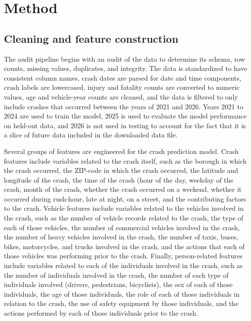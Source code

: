 \documentclass{article}
\begin{document}
\section{Method}
\subsection{Cleaning and feature construction}
The audit pipeline begins with an audit of the data to determine its schema, row counts, missing values, duplicates, and integrity. The data is standardized to have consistent column names, crash dates are parsed for date and time components, crash labels are lowercased, injury and fatality counts are converted to numeric values, age and vehicle-year counts are cleaned, and the data is filtered to only include crashes that occurred between the years of 2021 and 2026. Years 2021 to 2024 are used to train the model, 2025 is used to evaluate the model performance on held-out data, and 2026 is not used in testing to account for the fact that it is a slice of future data included in the downloaded data file.

Several groups of features are engineered for the crash prediction model.  Crash features include variables related to the crash itself, such as the borough in which the crash occurred, the ZIP-code in which the crash occurred, the latitude and longitude of the crash, the time of the crash (hour of the day, weekday of the crash, month of the crash, whether the crash occurred on a weekend, whether it occurred during rush-hour, late at night, on a street, and the contributing factors to the crash.  Vehicle features include variables related to the vehicles involved in the crash, such as the number of vehicle records related to the crash, the type of each of those vehicles, the number of commercial vehicles involved in the crash, the number of heavy vehicles involved in the crash, the number of taxis, buses, bikes, motorcycles, and trucks involved in the crash, and the actions that each of those vehicles was performing prior to the crash.  Finally, person-related features include variables related to each of the individuals involved in the crash, such as the number of individuals involved in the crash, the number of each type of individuals involved (drivers, pedestrians, bicyclists), the sex of each of those individuals, the age of those individuals, the role of each of those individuals in relation to the crash, the use of safety equipment by those individuals, and the actions performed by each of those individuals prior to the crash.
\end{document}
